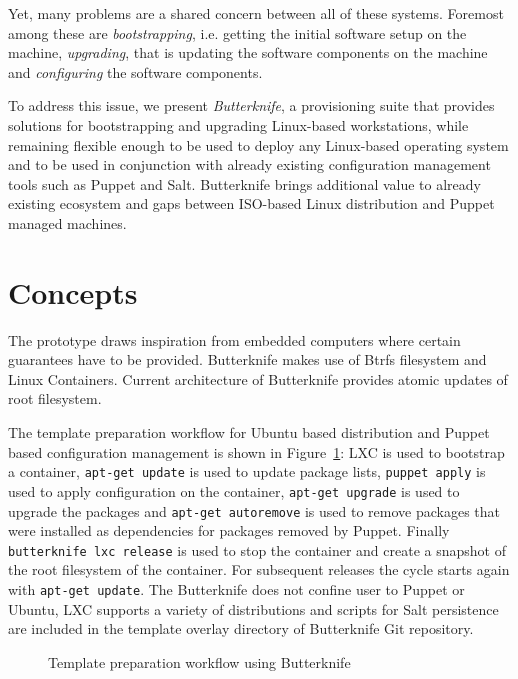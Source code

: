 \documentclass[a4paper,11pt]{kth-mag}
\begin{document}
Yet, many problems are a shared concern between all of these systems.
Foremost among these are \emph{bootstrapping}, i.e. getting
the initial software setup on the machine,
\emph{upgrading}, that is updating the software components on the machine and
\emph{configuring} the software components.

To address this issue, we present \emph{Butterknife},
a provisioning suite that provides solutions for bootstrapping and
upgrading Linux-based workstations, while remaining flexible enough
to be used to deploy any Linux-based operating system
and to be used in conjunction with already existing
configuration management tools such as Puppet and Salt.
Butterknife brings additional value to already existing
ecosystem and gaps between ISO-based Linux distribution
and Puppet managed machines.

\clearpage

\section{Concepts}
\label{sec:concepts}

The prototype draws inspiration from embedded computers
where certain guarantees have to be provided.
Butterknife makes use of Btrfs filesystem and Linux Containers.
Current architecture of Butterknife provides
atomic updates of root filesystem.

The template preparation workflow for
Ubuntu based distribution and Puppet based configuration
management is shown in
Figure~\ref{fig:template-preparation-workflow}:
LXC is used to bootstrap a container,
\texttt{apt-get update} is used to update package lists,
\texttt{puppet apply} is used to apply configuration on the container,
\texttt{apt-get upgrade} is used to upgrade the packages and
\texttt{apt-get autoremove} is used to remove packages that were installed as dependencies
for packages removed by Puppet.
Finally \texttt{butterknife lxc release} is used to stop
the container and create a snapshot of the root filesystem of the container.
For subsequent releases the cycle starts again with \texttt{apt-get update}.
The Butterknife does not confine user to Puppet or Ubuntu,
LXC supports a variety of distributions and scripts for
Salt persistence are included in the template overlay
directory of Butterknife Git repository.

\begin{figure}[!htb]
\centering
\scalebox{0.6}{}
\caption{Template preparation workflow using Butterknife}
\label{fig:template-preparation-workflow}
\end{figure}
\end{document}
